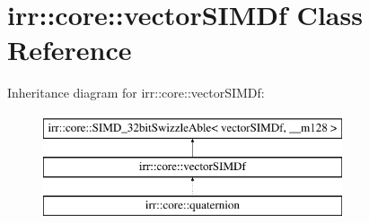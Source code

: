 \hypertarget{classirr_1_1core_1_1vectorSIMDf}{}\section{irr\+:\+:core\+:\+:vector\+S\+I\+M\+Df Class Reference}
\label{classirr_1_1core_1_1vectorSIMDf}
Inheritance diagram for irr\+:\+:core\+:\+:vector\+S\+I\+M\+Df\+:\begin{figure}[H]
\begin{center}
\leavevmode
\includegraphics[height=3.000000cm]{classirr_1_1core_1_1vectorSIMDf}
\end{center}
\end{figure}
